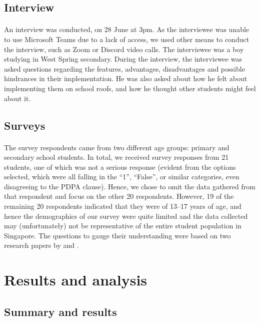 \documentclass[a4paper]{article}
\begin{document}
\begin{multicols}{2}
  \subsection{Interview}
  \paragraph{} An interview was conducted, on 28 June at 3pm. As
  the interviewee was unable to use Microsoft Teams due to a lack
  of access, we used other means to conduct the interview, such as
  Zoom or Discord video calls. The interviewee was a boy studying in
  West Spring secondary. During the interview, the interviewee was
  asked questions regarding the features, advantages, disadvantages and
  possible hindrances in their implementation. He was also asked about
  how he felt about implementing them on school roofs, and how he thought
  other students might feel about it.

  \subsection{Surveys}
  \paragraph{} The survey respondents came from two different age groups:
  primary and secondary school students. In total, we received survey
  responses from 21 students, one of which was not a serious response
  (evident from the options selected, which were all falling in the
  ``1'', ``False'', or similar categories, even disagreeing to the
  PDPA clause). Hence, we chose to omit the data gathered from that
  respondent and focus on the other 20 respondents. However, 19 of the
  remaining 20 respondents indicated that they were of 13--17 years of
  age, and hence the demographics of our survey were quite limited and
  the data collected may (unfortunately) not be representative of the
  entire student population in Singapore. The questions to gauge their
  understanding were based on two research papers by \cite{HKGreenRoofGL}
  and \cite{energeff}.



  \section{Results and analysis}
  \subsection{Summary and results}

\end{multicols}
\end{document}
